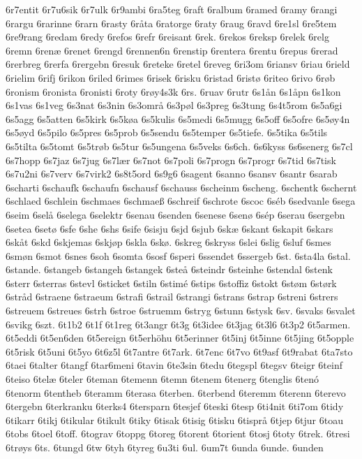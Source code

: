 6r7entit
6r7u6sik
6r7ulk
6r9ambi
6ra5teg
6raft
6ralbum
6ramed
6ramy
6rangi
6rargu
6rarinne
6rarn
6rasty
6råta
6ratorge
6raty
6raug
6ravd
6re1sl
6re5tem
6re9rang
6redam
6redy
6refos
6refr
6reisant
6rek.
6rekos
6reksp
6relek
6relg
6remn
6renæ
6renet
6rengd
6rennen6n
6renstip
6rentera
6rentu
6repus
6rerad
6rerbreg
6rerfa
6rergebn
6resuk
6reteke
6retel
6reveg
6ri3om
6riansv
6riau
6rield
6rielim
6rifj
6rikon
6riled
6rimes
6risek
6risku
6ristad
6ristø
6riteo
6rivo
6røb
6ronism
6ronista
6ronisti
6roty
6røy4s3k
6rs.
6ruav
6rutr
6s1ån
6s1åpn
6s1kon
6s1vas
6s1veg
6s3nat
6s3nin
6s3områ
6s3pøl
6s3preg
6s3tung
6s4t5rom
6s5a6gi
6s5agg
6s5atten
6s5kirk
6s5køa
6s5kulis
6s5medi
6s5mugg
6s5off
6s5ofre
6s5øy4n
6s5øyd
6s5pilo
6s5pres
6s5prob
6s5sendu
6s5temper
6s5tiefe.
6s5tika
6s5tils
6s5tilta
6s5tomt
6s5trøb
6s5tur
6s5ungena
6s5veks
6s6ch.
6s6kyss
6s6senerg
6s7cl
6s7hopp
6s7jaz
6s7jug
6s7lær
6s7not
6s7poli
6s7progn
6s7progr
6s7tid
6s7tisk
6s7u2ni
6s7verv
6s7virk2
6s8t5ord
6s9g6
6sagent
6sanno
6sansv
6santr
6sarab
6scharti
6schaufk
6schaufn
6schausf
6schauss
6scheinm
6scheng.
6schentk
6schernt
6schlaed
6schlein
6schmaes
6schmaeß
6schreif
6schrote
6scoc
6séb
6sedvanle
6sega
6seim
6selå
6selega
6selektr
6senau
6senden
6senese
6senø
6sép
6serau
6sergebn
6setea
6setø
6sfe
6she
6shs
6sife
6sisju
6sjd
6sjub
6skæ
6skant
6skapit
6skars
6skåt
6skd
6skjemas
6skjøp
6skla
6skø.
6skreg
6skryss
6slei
6slig
6sluf
6smes
6smøn
6smot
6snes
6soh
6somta
6sosf
6speri
6ssendet
6ssergeb
6st.
6sta4la
6stal.
6stande.
6stangeb
6stangeh
6stangek
6steå
6steindr
6steinhe
6stendal
6stenk
6sterr
6sterras
6stevl
6sticket
6stiln
6stimé
6stips
6stoffiz
6stokt
6støm
6størk
6stråd
6straene
6straeum
6strafi
6strail
6strangi
6strans
6strap
6streni
6strers
6streuem
6streues
6strh
6stroe
6struemm
6stryg
6stunn
6stysk
6sv.
6svaks
6svalet
6svikg
6szt.
6t1b2
6t1f
6t1reg
6t3angr
6t3g
6t3idee
6t3jag
6t3l6
6t3p2
6t5armen.
6t5eddi
6t5en6den
6t5ereign
6t5erhöhu
6t5erinner
6t5inj
6t5inne
6t5jing
6t5opple
6t5risk
6t5uni
6t5yo
6t6z5l
6t7antre
6t7ark.
6t7enc
6t7vo
6t9asf
6t9rabat
6ta7sto
6taei
6talter
6tangf
6tar6meni
6tavin
6te3sin
6tedu
6tegspl
6tegsv
6teigr
6teinf
6teiso
6telæ
6teler
6teman
6temenn
6temn
6tenem
6tenerg
6tenglis
6tenó
6tenorm
6tentheb
6teramm
6terasa
6terben.
6terbend
6teremm
6terenn
6terevo
6tergebn
6terkranku
6terks4
6tersparn
6tesjef
6teski
6tesp
6ti4nit
6ti7om
6tidy
6tikarr
6tikj
6tikular
6tikult
6tiky
6tisak
6tisig
6tisku
6tisprå
6tjep
6tjur
6toau
6tobs
6toel
6toff.
6tograv
6toppg
6toreg
6torent
6torient
6tosj
6toty
6trek.
6tresi
6trøys
6ts.
6tungd
6tw
6tyh
6tyreg
6u3ti
6ul.
6um7t
6unda
6unde.
6unden
